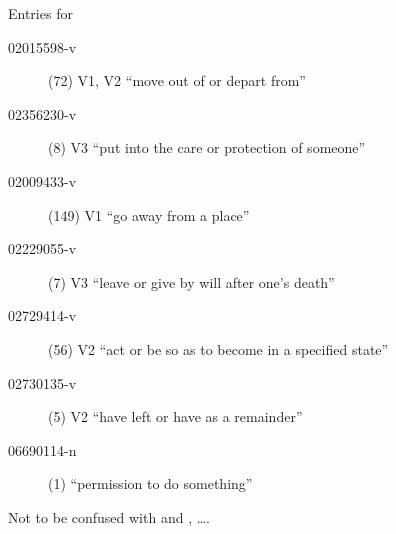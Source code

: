 \begin{frame}[allowframebreaks]{Entries for }
\begin{description}
\item [02015598-v] (72)
V1, V2 	 ``move out of or depart from''

\item [02356230-v] (8)
V3 	 ``put into the care or protection of someone''
      \item [02009433-v] (149)
V1 	 ``go away from a place''
\item[02229055-v] (7)
V3 	 ``leave or give by will after one's death''
\item [02729414-v] (56) V2 	 ``act or be so as to become in a specified state''
\item [02730135-v] (5) V2  ``have left or have as a remainder''

\item [06690114-n] (1)  ``permission to do something''
\end{description}

Not to be confused with  and , \ldots .
\end{frame}

